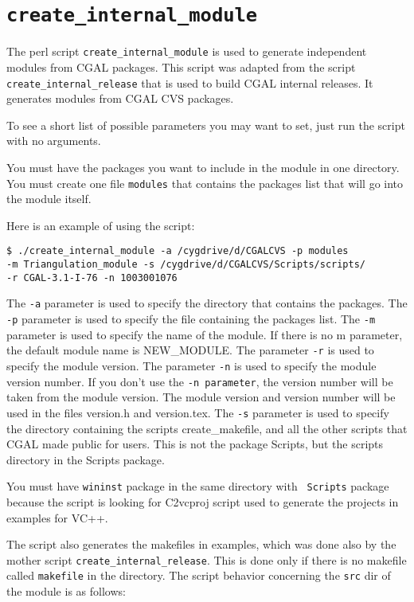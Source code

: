 \section{{\tt create\_internal\_module}}
\label{sec:create_internal_module}

The perl script {\tt create\_internal\_module} is used to generate independent
 modules from CGAL packages. This script was adapted from the script {\tt 
create\_internal\_release} that is used to build CGAL internal releases.
It generates modules from CGAL CVS packages.

To see a short list of possible parameters you may want to set, just run the 
script with no arguments.   

You must have the packages you want to include in the module in one directory. 
You must create one file {\tt modules} that contains the packages list that 
will go into the module itself.

Here is an example of using the script:
\begin{verbatim}
$ ./create_internal_module -a /cygdrive/d/CGALCVS -p modules 
-m Triangulation_module -s /cygdrive/d/CGALCVS/Scripts/scripts/
-r CGAL-3.1-I-76 -n 1003001076 
\end{verbatim}


The {\tt -a} parameter is used to specify the directory that contains the packages. 
The {\tt -p} parameter is used to specify the file containing the packages list. 
The {\tt -m} parameter is used to specify the name of the module. If there is no m parameter, the default module name is NEW\_MODULE.   
The parameter {\tt -r} is used to specify the module version. 
The parameter {\tt -n} is used to specify the module version number. If you don't use the {\tt -n parameter}, the version number will be taken from the module version. The module version and version number will be used in the files version.h and version.tex. 
The {\tt -s} parameter is used to specify the directory containing the scripts create\_makefile, and all the other scripts that CGAL made public for users. This is not the package Scripts, but the scripts directory in the Scripts package.  

You must have {\tt wininst} package in the same directory with {\tt
  Scripts} package because the script is looking for C2vcproj script
used to generate the projects in examples for VC++.

The script also generates the makefiles in examples, which was done
also by the mother script {\tt create\_internal\_release}. This is
done only if there is no makefile called {\tt makefile} in the
directory.  The script behavior concerning the {\tt src} dir of the
module is as follows:

